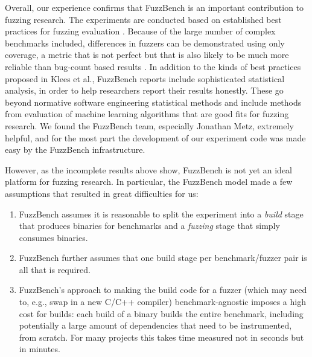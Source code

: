 Overall, our experience confirms that FuzzBench is an important contribution to fuzzing research.  The experiments are conducted based on established best practices for fuzzing evaluation \cite{evalfuzz}.  Because of the large number of complex benchmarks included, differences in fuzzers can be demonstrated using only coverage, a metric that is not perfect \cite{FuzzAppeal} but that is also likely to be much more reliable than bug-count based results \cite{FuzzAppeal,PLDI13}.  In addition to the kinds of best practices proposed in Klees et al., FuzzBench reports include sophisticated statistical analysis, in order to help researchers report their results honestly.  These go beyond normative software engineering statistical methods \cite{arcuri2014hitchhiker} and include methods from evaluation of machine learning algorithms \cite{CompClass} that are good fits for fuzzing research.  We found the FuzzBench team, especially Jonathan Metz, extremely helpful, and for the most part the development of our experiment code was made easy by the FuzzBench infrastructure.

However, as the incomplete results above show, FuzzBench is not yet an ideal platform for fuzzing research.  In particular, the FuzzBench model made a few assumptions that resulted in great difficulties for us:

\begin{enumerate}
\item FuzzBench assumes it is reasonable to split the experiment into a \emph{build} stage that produces binaries for benchmarks and a \emph{fuzzing} stage that simply consumes binaries.
\item FuzzBench further assumes that one build stage per benchmark/fuzzer pair is all that is required.
\item FuzzBench's approach to making the build code for a fuzzer (which may need to, e.g., swap in a new C/C++ compiler) benchmark-agnostic imposes a high cost for builds: each build of a binary builds the entire benchmark, including potentially a large amount of dependencies that need to be instrumented, from scratch.  For many projects this takes time measured not in seconds but in minutes.
\end{enumerate}

